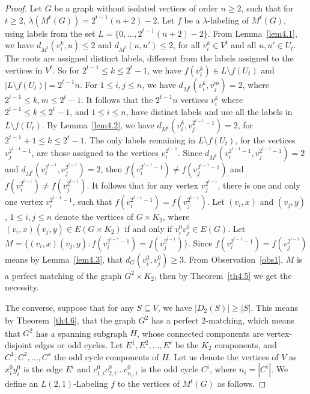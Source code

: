 \documentclass{article}
\newtheorem{open problem} {Open Problem}
\numberwithin{lemma}{section}
\numberwithin{theorem}{section}
\numberwithin{cor}{section}
\numberwithin{prop}{section}
\numberwithin{con}{section}
\numberwithin{claim}{section}
\numberwithin{obs}{section}
\numberwithin{dnt}{section}
\begin{document}
\begin{proof}
	Let $G$ be a graph without isolated vertices of order $n\geq 2$, such that for $t \geq 2$, $\lambda(M^t(G))=2^{t-1}(n+2)-2$. Let $f$ be a $\lambda$-labeling of $M^t(G)$, using labels from the set  $L=\{0,\ldots,2^{t-1}(n+2)-2\}$. From Lemma~\ref{lem4.1}, we have $d_{M^t}(v^k_i,u) \leq 2$ and $d_{M^t}(u,u') \leq 2$,  for all $v^k_i\in V^t$ and all $u,u'\in U_t$. The roots are assigned distinct labels, different from the labels assigned to the vertices in $V^t$. So for $2^{t-1}\leq k \leq 2^t-1$, we have $f(v^k_i)\in L\setminus f(U_t)$ and $|L\setminus f(U_t)|=2^{t-1}n$. For $1\leq i,j \leq n$, we have  $d_{M^t}(v^k_i,v^m_j)=2$, where $2^{t-1}\leq k,m \leq 2^t-1$. It follows that the $2^{t-1}n$ vertices $v^k_i$ where $2^{t-1}\leq k \leq 2^t-1$, and $1\leq i \leq n$, have distinct labels and use all the labels in $L\setminus f(U_t)$. By Lemma~\ref{lem4.2}, we have $d_{M^t}(v^k_i,v^{2^{t-1}-1}_j)=2$, for $2^{t-1}+1\leq k \leq 2^t-1$. The only labels remaining in $L\setminus f(U_t)$, for the vertices $v^{2^{t-1}-1}_j$, are those assigned to the vertices $v_i^{2^{t-1}}$. Since $d_{M^t}(v^{2^{t-1}-1}_i,v^{2^{t-1}-1}_j)=2$ and $d_{M^t}(v^{2^{t-1}}_i,v^{2^{t-1}}_j)=2$, then $f(v^{2^{t-1}-1}_i)\neq f(v^{2^{t-1}-1}_j)$ and $f(v^{2^{t-1}}_i)\neq f(v^{2^{t-1}}_j)$. It follows that for any vertex $v^{2^{t-1}}_j$,   there is one and only one vertex $v^{2^{t-1}-1}_i$, such that $f(v^{2^{t-1}-1}_i)=f(v^{2^{t-1}}_j)$. Let $(v_i,x)$ and $(v_j,y)$, $1\leq i,j\leq n$ denote the vertices of $G\times K_2$, where $(v_i,x)(v_j,y)\in E(G\times K_2)$ if and only if  $v_i^0v_j^0 \in E(G)$. Let $M=\{(v_i,x)(v_j,y) : f(v^{2^{t-1}-1}_i)=f(v^{2^{t-1}}_j)\}$. Since $f(v^{2^{t-1}-1}_i)=f(v^{2^{t-1}}_j)$ means by Lemma~\ref{lem4.3}, that $d_G(v_i^0,v_j^0)\geq 3$. From Observation~\ref{obs1}, $M$ is a perfect matching of the graph $\overline{G^2}\times K_2$, then by Theorem~\ref{th4.5} we get the necessity. \par
	The converse, suppose that for any $S\subseteq V$, we have  $|D_2(S)|\geq |S|$. This means by Theorem~\ref{th4.6}, that the graph $\overline{G^2}$ has a perfect $2$-matching, which means that $\overline{G^2}$ has a spanning subgraph $H$, whose connected components are vertex-disjoint edges or odd cycles. Let  $E^1,E^2,\ldots,E^r$  be the $K_2$ components, and $C^1,C^2,\ldots,C^s$  the odd cycle components of $H$. Let us denote the vertices of $V$ as  $x^0_iy^0_i$ is the edge $E^i$ and $c^0_{1,i}c^0_{2,i}\ldots c^0_{n_i,i}$ is the odd cycle $C^i$, where $n_i=|C^i|$. We define an $L(2,1)$-Labeling $f$ to the vertices of $M^t(G)$ as follows.\par

\end{proof}
\end{document}
